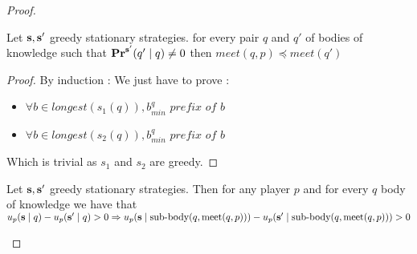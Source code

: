 \begin{proof} 
\begin{mylem}
	\label{lem-meet}
	Let $\mathbf{s}, \mathbf{s}'$ greedy stationary strategies. for every pair $q$ and $q'$ of bodies of knowledge such that $\mathbf{Pr}^{\mathbf{s}'}(q' \mid q) \neq 0$ then $meet(q,p) \preceq meet(q')$
\end{mylem}	
\begin{proof}
By induction : 
We just have to prove : 
\begin{itemize}
	\item $\forall b \in longest(s_1(q)), b^q_{min} \textit{ prefix of } b $
	\item $\forall b \in longest(s_2(q)), b^q_{min} \textit{ prefix of } b $
\end{itemize}
Which is trivial as $s_1$ and $s_2$ are greedy.
\end{proof}
	
\begin{mylem}
	Let $\mathbf{s}, \mathbf{s}'$ greedy stationary strategies. Then for any player $p$ and for every $q$ body of knowledge we have that $u_p(\mathbf{s} \mid q) - u_p(\mathbf{s}' \mid q) > 0 \Rightarrow u_p(\mathbf{s} \mid {\text{\rm sub-body}}(q,\text{\rm meet}(q,p))) - u_p(\mathbf{s}' \mid {\text{\rm sub-body}}(q,\text{\rm meet}(q,p))) > 0$
\end{mylem}


\end{proof}
